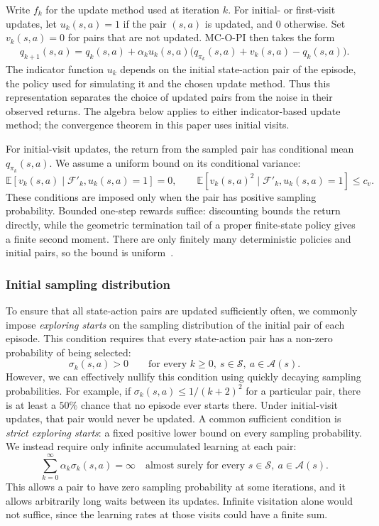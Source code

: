 Write $f_k$ for the update method used at iteration $k$.
For initial- or first-visit updates, let $u_k(s,a)=1$ if the pair $(s,a)$ is updated, and $0$ otherwise. Set $v_k(s,a)=0$ for pairs that are not updated.
MC-O-PI then takes the form
\begin{align}
\label{eq: update q with chi}
q_{k+1}(s,a)
= q_k(s,a)+\alpha_k u_k(s,a)\big(q_{\pi_k}(s,a)+v_k(s,a)-q_k(s,a)\big).
\end{align}
The indicator function $u_k$ depends on the initial state-action pair of the episode, the policy used for simulating it and the chosen update method.
Thus this representation separates the choice of updated pairs from the noise in their observed returns. The algebra below applies to either indicator-based update method; the convergence theorem in this paper uses initial visits.

For initial-visit updates, the return from the sampled pair has conditional mean $q_{\pi_k}(s,a)$. We assume a uniform bound on its conditional variance:
\begin{equation}
\label{eq: return moments}
\mathbb E[v_k(s,a)\mid\mathcal F'_k,u_k(s,a)=1]=0,
\qquad
\mathbb E[v_k(s,a)^2\mid\mathcal F'_k,u_k(s,a)=1]\le c_v.
\end{equation}
These conditions are imposed only when the pair has positive sampling probability. Bounded one-step rewards suffice: discounting bounds the return directly, while the geometric termination tail of a proper finite-state policy gives a finite second moment. There are only finitely many deterministic policies and initial pairs, so the bound is uniform~\citep[Section~2.2.1]{Bertsekas1996Neuro-DynamicProgramming}.

\subsubsection{Initial sampling distribution}

To ensure that all state-action pairs are updated sufficiently often, we commonly impose \textit{exploring starts} on the sampling distribution of the initial pair of each episode. This condition requires that every state-action pair has a non-zero probability of being selected:
\[
\sigma_k(s,a)>0\qquad\text{for every }k\ge0,\ s\in\mathcal S,\ a\in\mathcal A(s).
\]
However, we can effectively nullify this condition using quickly decaying sampling probabilities.
For example, if $\sigma_k(s,a)\le1/(k+2)^2$ for a particular pair, there is at least a $50\%$ chance that no episode ever starts there. Under initial-visit updates, that pair would never be updated.
A common sufficient condition is \textit{strict exploring starts}: a fixed positive lower bound on every sampling probability. We instead require only infinite accumulated learning at each pair:
\begin{equation}
\label{eq: cumulative learning}
\sum_{k=0}^{\infty}\alpha_k\sigma_k(s,a)=\infty
\quad\text{almost surely for every }s\in\mathcal S,\ a\in\mathcal A(s).
\end{equation}
This allows a pair to have zero sampling probability at some iterations, and it allows arbitrarily long waits between its updates. Infinite visitation alone would not suffice, since the learning rates at those visits could have a finite sum.


